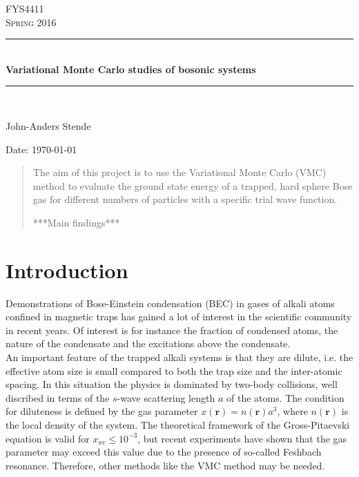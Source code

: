 \documentclass[english, a4paper]{article}
\begin{document}
\renewcommand{\figurename}{Figure}
\begin{titlepage}
\begin{center}

\textsc{\Large FYS4411}\\[0.5cm]
\textsc{\Large Spring 2016}\\[1.5cm]
\rule{\linewidth}{0.5mm} \\[0.4cm]
{ \huge \bfseries Variational Monte Carlo studies of bosonic systems}\\[0.10cm]
\rule{\linewidth}{0.5mm} \\[1.5cm]

\begin{minipage}{0.49\textwidth}
    \begin{center} \large
        John-Anders Stende \\[0.8cm]
    \end{center}
\end{minipage}


\vfill

\large{Date: \today}

\end{center}
\end{titlepage}


\begin{abstract}
The aim of this project is to use the Variational Monte Carlo (VMC) method to evaluate the 
ground state energy of a trapped, hard sphere Bose gas for different numbers of particles
with a specific trial wave function. 

***Main findings***
\end{abstract}


\section*{Introduction}
Demonstrations of Bose-Einstein condensation (BEC) in gases of alkali atoms confined in magnetic traps has gained
a lot of interest in the scientific community in recent years. Of interest is for instance the fraction of condensed atoms, 
the nature of the condensate and the excitations above the condensate. \\

\noindent An important feature of the trapped alkali systems is that they are dilute, i.e. the effective atom size
is small compared to both the trap size and the inter-atomic spacing. In this situation the physics is
dominated by two-body collisions, well discribed in terms of the $s$-wave scattering length $a$ of the atoms.
The condition for diluteness is defined by the gas parameter $x(\mathbf{r}) = n(\mathbf{r})a^3$, where $n(\mathbf{r})$
is the local density of the system. The theoretical framework of the Gross-Pitaevski equation is valid for $x_{av} \leq 10^{-3}$,
but recent experiments have shown that the gas parameter may exceed this value due to the presence of so-called Feshbach resonance.
Therefore, other methods like the VMC method may be needed. \\
\end{document}
